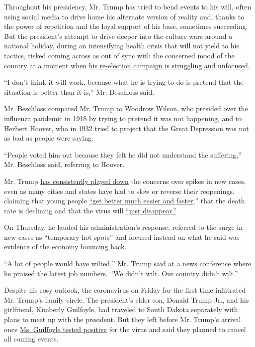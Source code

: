 Throughout his presidency, Mr. Trump has tried to bend events to his
will, often using social media to drive home his alternate version of
reality and, thanks to the power of repetition and the loyal support of
his base, sometimes succeeding. But the president's attempt to drive
deeper into the culture wars around a national holiday, during an
intensifying health crisis that will not yield to his tactics, risked
coming across as out of sync with the concerned mood of the country at a
moment when
\href{https://www.nytimes.com/2020/07/02/us/politics/trump-2020-campaign-problems.html}{his
re-election campaign is struggling and unfocused}.

``I don't think it will work, because what he is trying to do is pretend
that the situation is better than it is,'' Mr. Beschloss said.

Mr. Beschloss compared Mr. Trump to Woodrow Wilson, who presided over
the influenza pandemic in 1918 by trying to pretend it was not
happening, and to Herbert Hoover, who in 1932 tried to project that the
Great Depression was not as bad as people were saying.

``People voted him out because they felt he did not understand the
suffering,'' Mr. Beschloss said, referring to Hoover.

Mr. Trump
\href{https://www.nytimes.com/2020/06/26/us/politics/trump-coronavirus.html}{has
consistently played down} the concerns over spikes in new cases, even as
many cities and states have had to slow or reverse their reopenings,
claiming that young people
\href{https://twitter.com/realDonaldTrump/status/1278897430378041344}{``get
better much easier and faster},'' that the death rate is declining and
that the virus will
\href{https://www.nbcnews.com/politics/white-house/trump-says-he-thinks-coronavirus-will-just-disappear-despite-rising-n1232709}{``just
disappear.''}

On Thursday, he lauded his administration's response, referred to the
surge in new cases as ``temporary hot spots'' and focused instead on
what he said was evidence of the economy bouncing back.

``A lot of people would have wilted,''
\href{https://www.whitehouse.gov/briefings-statements/remarks-president-trump-jobs-numbers-report-2/}{Mr.
Trump said at a news conference} where he praised the latest job
numbers. ``We didn't wilt. Our country didn't wilt.''

Despite his rosy outlook, the coronavirus on Friday for the first time
infiltrated Mr. Trump's family circle. The president's elder son, Donald
Trump Jr., and his girlfriend, Kimberly Guilfoyle, had traveled to South
Dakota separately with plans to meet up with the president. But they
left before Mr. Trump's arrival once
\href{https://www.nytimes.com/2020/07/03/us/politics/kimberly-guilfoyle-trump-campaign-coronavirus.html}{Ms.
Guilfoyle tested positive} for the virus and said they planned to cancel
all coming events.

